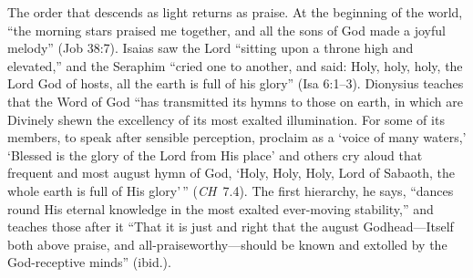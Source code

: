 The order that descends as light returns as praise. At the beginning of the
world, ``the morning stars praised me together, and all the sons of God made
a joyful melody'' (Job 38:7). Isaias saw the Lord ``sitting upon a throne
high and elevated,'' and the Seraphim ``cried one to another, and said: Holy,
holy, holy, the Lord God of hosts, all the earth is full of his glory'' (Isa
6:1--3). Dionysius teaches that the Word of God ``has transmitted its hymns to
those on earth, in which are Divinely shewn the excellency of its most
exalted illumination. For some of its members, to speak after sensible
perception, proclaim as a `voice of many waters,' `Blessed is the glory of
the Lord from His place' and others cry aloud that frequent and most august
hymn of God, `Holy, Holy, Holy, Lord of Sabaoth, the whole earth is full of
His glory'\,'' (\emph{CH}~7.4). The first hierarchy, he says, ``dances round
His eternal knowledge in the most exalted ever-moving stability,'' and
teaches those after it ``That it is just and right that the august
Godhead---Itself both above praise, and all-praiseworthy---should be known and
extolled by the God-receptive minds'' (ibid.).

